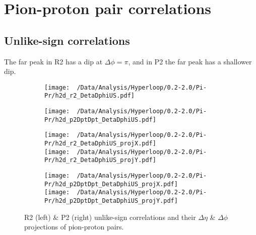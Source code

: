 \documentclass[12pt,a4paper,twoside]{report}
\begin{document}
\section{Pion-proton pair correlations}
\subsection{Unlike-sign correlations}
The far peak in R2 has a dip at $\Delta\phi=\pi$, and in P2 the far peak has a shallower dip.
\begin{figure}[H]
	\begin{subfigure}{0.49\linewidth}
		\texttt{[image: ~/Data/Analysis/Hyperloop/0.2-2.0/Pi-Pr/h2d\_r2\_DetaDphiUS.pdf]}\\
	\end{subfigure}
	\begin{subfigure}{0.49\linewidth}
		\texttt{[image: ~/Data/Analysis/Hyperloop/0.2-2.0/Pi-Pr/h2d\_p2DptDpt\_DetaDphiUS.pdf]}\\
	\end{subfigure}
\end{figure}
\begin{figure}[H]
	\ContinuedFloat
	\begin{subfigure}{0.49\linewidth}
		\texttt{[image: ~/Data/Analysis/Hyperloop/0.2-2.0/Pi-Pr/h2d\_r2\_DetaDphiUS\_projX.pdf]}\\
		\texttt{[image: ~/Data/Analysis/Hyperloop/0.2-2.0/Pi-Pr/h2d\_r2\_DetaDphiUS\_projY.pdf]}\\
	\end{subfigure}
	\begin{subfigure}{0.49\linewidth}
		\texttt{[image: ~/Data/Analysis/Hyperloop/0.2-2.0/Pi-Pr/h2d\_p2DptDpt\_DetaDphiUS\_projX.pdf]}\\
		\texttt{[image: ~/Data/Analysis/Hyperloop/0.2-2.0/Pi-Pr/h2d\_p2DptDpt\_DetaDphiUS\_projY.pdf]}\\
	\end{subfigure}
	\caption{R2 (left) \& P2 (right) unlike-sign correlations and their $\Delta\eta$ \& $\Delta\phi$ projections of pion-proton pairs.}
\end{figure}
\end{document}
